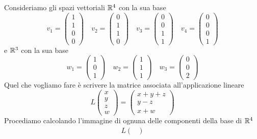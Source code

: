 \begin{example}
	Consideriamo gli spazi vettoriali $\mathbb{R}^4$ con la sua base
	\[
		v_1 = \begin{pmatrix}
			1 \\ 1 \\ 0 \\ 0
		\end{pmatrix} \quad
		v_2 = \begin{pmatrix}
			0 \\ 1 \\ 1 \\ 0
		\end{pmatrix} \quad
		v_3 = \begin{pmatrix}
			0 \\ 0 \\ 1 \\ 1
		\end{pmatrix} \quad
		v_4 = \begin{pmatrix}
			0 \\ 0 \\ 0 \\ 1
		\end{pmatrix}
	\]
	e $\mathbb{R}^3$ con la sua base
	\[
		w_1 = \begin{pmatrix}
			1 \\ 0 \\ 1
		\end{pmatrix} \quad
		w_2 = \begin{pmatrix}
			1 \\ 1 \\ 1
		\end{pmatrix} \quad
		w_3 = \begin{pmatrix}
			0 \\ 0 \\ 2
		\end{pmatrix}
	\]
	Quel che vogliamo fare è scrivere la matrice associata all'applicazione lineare
	\[
		L \begin{pmatrix}
			x \\ y \\ z \\ w
		\end{pmatrix} = \begin{pmatrix}
			x + y + z \\
			y - z     \\
			x + w
		\end{pmatrix}
	\]
	Procediamo calcolando l'immagine di ognuna delle componenti della base di $\mathbb{R}^4$
	\begin{align*}
		L \begin{pmatrix}

\end{pmatrix}
\end{align*}
\end{example}
